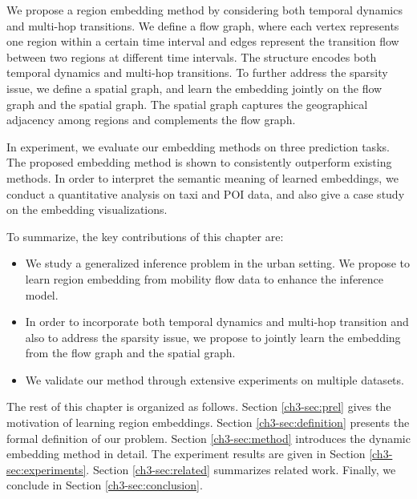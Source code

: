 We propose a region embedding method by considering both temporal dynamics and  multi-hop transitions. We define a flow graph, where each vertex represents one region within a certain time interval and edges represent the transition flow between two regions at different time intervals. The structure encodes both temporal dynamics and multi-hop transitions. To further address the sparsity issue, we define a spatial graph, and learn the embedding jointly on the flow graph and the spatial graph. The spatial graph captures the geographical adjacency among regions and complements the flow graph.

In experiment, we evaluate our embedding methods on three prediction tasks. The proposed embedding method is shown to consistently outperform existing methods. In order to interpret the semantic meaning of learned embeddings, we conduct a quantitative analysis on taxi and POI data, and also give a case study on the embedding visualizations.

To summarize, the key contributions of this chapter are:
\begin{itemize}[leftmargin=*]
\item We study a generalized inference problem in the urban setting. We propose to learn region embedding from mobility flow data to enhance the inference model.
\item In order to incorporate both temporal dynamics and multi-hop transition and also to address the sparsity issue, we propose to jointly learn the embedding from the flow graph and the spatial graph. 
\item We validate our method through extensive experiments on multiple datasets.
\end{itemize}

The rest of this chapter is organized as follows. Section \ref{ch3-sec:prel} gives the motivation of learning region embeddings. Section \ref{ch3-sec:definition} presents the formal definition of our problem. Section \ref{ch3-sec:method} introduces the dynamic embedding method in detail. The experiment results are given in Section \ref{ch3-sec:experiments}. Section \ref{ch3-sec:related} summarizes related work. Finally, we conclude in Section \ref{ch3-sec:conclusion}.